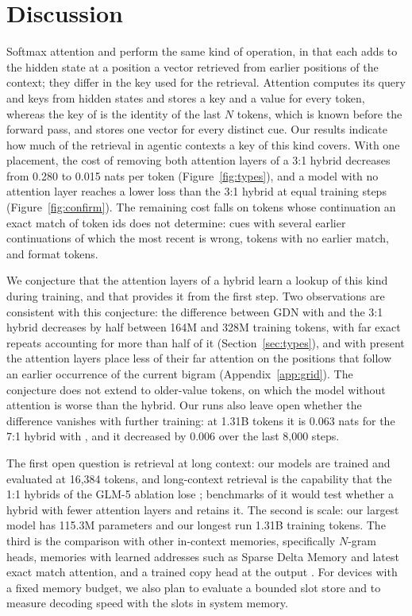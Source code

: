 \section{Discussion}
\label{sec:discussion}

Softmax attention and \ingram{} perform the same kind of operation, in that each adds to the hidden
state at a position a vector retrieved from earlier positions of the context; they differ in the
key used for the retrieval. Attention computes its query and keys from hidden states and stores a
key and a value for every token, whereas the key of \ingram{} is the identity of the last $N$
tokens, which is known before the forward pass, and \ingram{} stores one vector for every distinct
cue. Our results indicate how
much of the retrieval in agentic contexts a key of this kind covers. With one placement, the cost
of removing both attention layers of a 3:1 hybrid decreases from 0.280 to 0.015 nats per token
(Figure~\ref{fig:types}), and a model with no attention layer reaches a lower loss than the 3:1
hybrid at equal training steps (Figure~\ref{fig:confirm}). The remaining cost falls on tokens
whose continuation an exact match of token ids does not determine: cues with several earlier
continuations of which the most recent is wrong, tokens with no earlier match, and format tokens.

We conjecture that the attention layers of a hybrid learn a lookup of this kind during training,
and that \ingram{} provides it from the first step. Two observations are consistent with
this conjecture: the difference between GDN with \ingram{} and the 3:1 hybrid decreases by half
between 164M and 328M training tokens, with far exact repeats accounting for more than half of it
(Section~\ref{sec:types}), and with \ingram{} present the attention layers place less of their far
attention on the positions that follow an earlier occurrence of the current bigram
(Appendix~\ref{app:grid}). The conjecture does not extend to older-value tokens, on which the
model without attention is worse than the hybrid. Our runs also leave open whether the difference
vanishes with further training: at 1.31B tokens it is 0.063 nats for the 7:1 hybrid with
\ingram{}, and it decreased by 0.006 over the last 8,000 steps.

The first open question is retrieval at long context: our models are trained and evaluated at
16,384 tokens, and long-context retrieval is the capability that the 1:1 hybrids of the GLM-5
ablation lose \citep{glm5}; benchmarks of it would test whether a hybrid with fewer attention layers and
\ingram{} retains it. The second is scale: our largest model has 115.3M parameters and our longest
run 1.31B training tokens. The third is the comparison with other in-context memories,
specifically $N$-gram heads, memories with learned addresses such as Sparse Delta Memory and
latest exact match attention, and a trained copy head at the output \citep{godey2026}. For devices with a fixed memory budget, we also plan to evaluate a
bounded slot store and to measure decoding speed with the slots in system memory.

